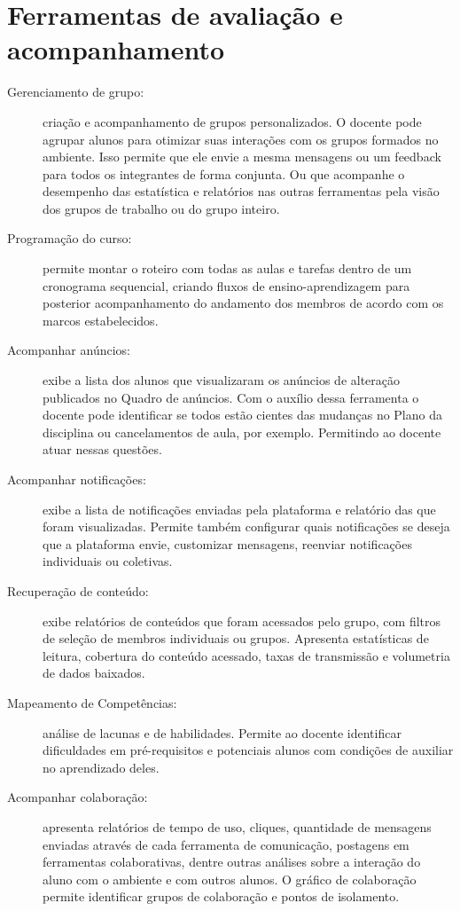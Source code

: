 \section{Ferramentas de avaliação e acompanhamento}%
\label{sec:aval}
\begin{description}

\item[Gerenciamento de grupo:] criação e acompanhamento de grupos personalizados. O docente pode agrupar alunos para otimizar suas interações com os grupos formados no ambiente. Isso permite que ele envie a mesma mensagens ou um feedback para todos os integrantes de forma conjunta. Ou que acompanhe o desempenho das estatística e relatórios nas outras ferramentas pela visão dos grupos de trabalho ou do grupo inteiro. 

\item[Programação do curso:] permite montar o roteiro com todas as aulas e tarefas dentro de um cronograma sequencial, criando fluxos de ensino-aprendizagem para posterior acompanhamento do andamento dos membros de acordo com os marcos estabelecidos.

\item[Acompanhar anúncios:] exibe a lista dos alunos que visualizaram os anúncios de alteração publicados no Quadro de anúncios. Com o auxílio dessa ferramenta o docente pode identificar se todos estão cientes das mudanças no Plano da disciplina ou cancelamentos de aula, por exemplo. Permitindo ao docente atuar nessas questões. 

\item[Acompanhar notificações:] exibe a lista de notificações enviadas pela plataforma e relatório das que foram visualizadas. Permite também configurar quais notificações se deseja que a plataforma envie, customizar mensagens, reenviar notificações individuais ou coletivas.

\item[Recuperação de conteúdo:] exibe relatórios de conteúdos que foram acessados pelo grupo, com filtros de seleção de membros individuais ou grupos. Apresenta estatísticas de leitura, cobertura do conteúdo acessado, taxas de transmissão e volumetria de dados baixados. 

\item[Mapeamento de Competências:] análise de lacunas e de habilidades. Permite ao docente identificar dificuldades em pré-requisitos e potenciais alunos com condições de auxiliar no aprendizado deles.

\item[Acompanhar colaboração:] apresenta relatórios de tempo de uso, cliques, quantidade de mensagens enviadas através de cada ferramenta de comunicação, postagens em ferramentas colaborativas, dentre outras análises sobre a interação do aluno com o ambiente e com outros alunos. O gráfico de colaboração permite identificar grupos de colaboração e pontos de isolamento.


\end{description}
